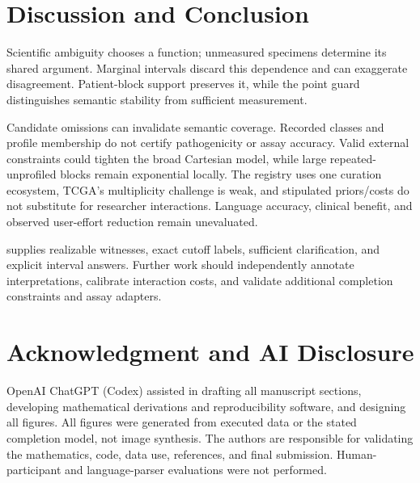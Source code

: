 



\section{Discussion and Conclusion}
Scientific ambiguity chooses a function; unmeasured specimens determine its shared argument. Marginal intervals discard this dependence and can exaggerate disagreement. Patient-block support preserves it, while the point guard distinguishes semantic stability from sufficient measurement.

Candidate omissions can invalidate semantic coverage. Recorded classes and profile membership do not certify pathogenicity or assay accuracy. Valid external constraints could tighten the broad Cartesian model, while large repeated-unprofiled blocks remain exponential locally. The registry uses one curation ecosystem, TCGA's multiplicity challenge is weak, and stipulated priors/costs do not substitute for researcher interactions. Language accuracy, clinical benefit, and observed user-effort reduction remain unevaluated.

\CLARA{} supplies realizable witnesses, exact cutoff labels, sufficient clarification, and explicit interval answers. Further work should independently annotate interpretations, calibrate interaction costs, and validate additional completion constraints and assay adapters.

\section*{Acknowledgment and AI Disclosure}
OpenAI ChatGPT (Codex) assisted in drafting all manuscript sections, developing mathematical derivations and reproducibility software, and designing all figures. All figures were generated from executed data or the stated completion model, not image synthesis. The authors are responsible for validating the mathematics, code, data use, references, and final submission. Human-participant and language-parser evaluations were not performed.


